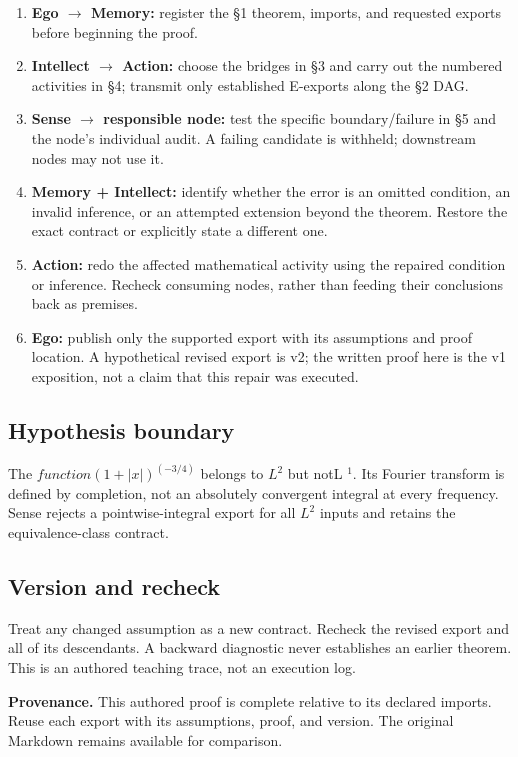 \documentclass[preprint,12pt,aps,pra,showkeys,amsmath,amssymb,superscriptaddress,floatfix]{revtex4-2}
\theoremstyle{definition}
\theoremstyle{remark}
\providecommand{\tightlist}{\setlength{\itemsep}{2pt}\setlength{\parskip}{0pt}}
\begin{document}
\begin{enumerate}
\def\labelenumi{\arabic{enumi}.}
\tightlist
\item
  \textbf{Ego \(\to\) Memory:} register the §1 theorem, imports, and
  requested exports before beginning the proof.
\item
  \textbf{Intellect \(\to\) Action:} choose the bridges in §3 and carry
  out the numbered activities in §4; transmit only established E-exports
  along the §2 DAG.
\item
  \textbf{Sense \(\to\) responsible node:} test the specific
  boundary/failure in §5 and the node's individual audit. A failing
  candidate is withheld; downstream nodes may not use it.
\item
  \textbf{Memory + Intellect:} identify whether the error is an omitted
  condition, an invalid inference, or an attempted extension beyond the
  theorem. Restore the exact contract or explicitly state a different
  one.
\item
  \textbf{Action:} redo the affected mathematical activity using the
  repaired condition or inference. Recheck consuming nodes, rather than
  feeding their conclusions back as premises.
\item
  \textbf{Ego:} publish only the supported export with its assumptions
  and proof location. A hypothetical revised export is v2; the written
  proof here is the v1 exposition, not a claim that this repair was
  executed.
\end{enumerate}

\subsection{Hypothesis boundary}
The \(function(1+|x|)^{(-3/4)}\) belongs to \(L^{2}\) but notL \(^{1}\).
Its Fourier transform is defined by completion, not an absolutely
convergent integral at every frequency. Sense rejects a
pointwise-integral export for all \(L^{2}\) inputs and retains the
equivalence-class contract.

\subsection{Version and recheck}
Treat any changed assumption as a new contract. Recheck the revised
export and all of its descendants. A backward diagnostic never
establishes an earlier theorem. This is an authored teaching trace, not
an execution log.

\par\medskip\begingroup\small\linespread{1.0}\selectfont\noindent\textbf{Provenance.} This authored proof is complete relative to its declared imports. Reuse
each export with its assumptions, proof, and version. The original
Markdown remains available for comparison.
\par\endgroup
\end{document}

